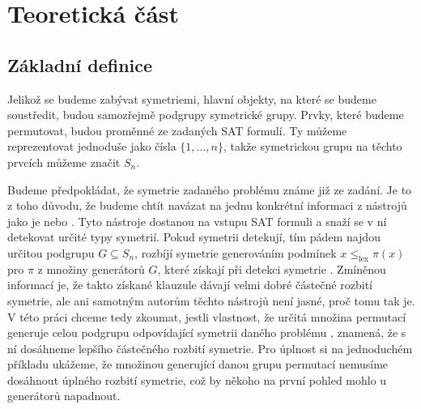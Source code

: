 
\chapter{Teoretická část}


\section{Základní definice}

Jelikož se budeme zabývat symetriemi, hlavní objekty, na které se budeme soustředit, budou samozřejmě podgrupy symetrické grupy. Prvky, které budeme permutovat, budou proměnné ze zadaných SAT formulí. Ty můžeme reprezentovat jednoduše jako čísla $\{1,...,n\}$, takže symetrickou grupu na těchto prvcích můžeme značit $S_n$.

Budeme předpokládat, že symetrie zadaného problému známe již ze zadání. Je to z toho důvodu, že budeme chtít navázat na jednu konkrétní informaci z nástrojů jako je  nebo  \cite{devriendt2016breakidstaticsymmetrybreaking}\cite{DBLP:journals/corr/abs-2406-13557}. Tyto nástroje dostanou na vstupu SAT formuli a snaží se v ní detekovat určité typy symetrií. Pokud symetrii detekují, tím pádem najdou určitou podgrupu $G \subseteq S_n$, rozbíjí symetrie generováním  podmínek $x \leq_{\text{lex}} \pi(x)$ pro $\pi$ z množiny generátorů $G$, které získají při detekci symetrie \cite{devriendt2016breakidstaticsymmetrybreaking}\cite{DBLP:journals/corr/abs-2406-13557}. Zmíněnou informací je, že takto získané klauzule dávají velmi dobré částečné rozbití symetrie, ale ani samotným autorům těchto nástrojů není jasné, proč tomu tak je. V této práci chceme tedy zkoumat, jestli vlastnost, že určitá množina permutací generuje celou podgrupu odpovídající symetrii daného problému , znamená, že s ní dosáhneme lepšího částečného rozbití symetrie. Pro úplnost si na jednoduchém příkladu ukážeme, že množinou generující danou grupu permutací nemusíme dosáhnout úplného rozbití symetrie, což by někoho na první pohled mohlo u generátorů napadnout.

